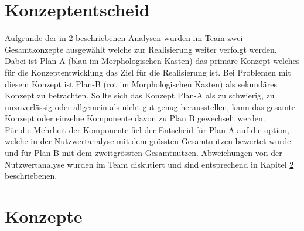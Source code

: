 \documentclass[11pt]{scrartcl}
\begin{document}
       


        \section{Konzeptentscheid}
        Aufgrunde der in \ref{konzepte} beschriebenen Analysen wurden im Team zwei Gesamtkonzepte ausgewählt welche zur Realisierung weiter verfolgt werden. Dabei ist Plan-A (blau im Morphologischen Kasten) das primäre Konzept welches für die Konzeptentwicklung das Ziel für die Realisierung ist. Bei Problemen mit diesem Konzept ist Plan-B (rot im Morphologischen Kasten) als sekundäres Konzept zu betrachten. Sollte sich das Konzept Plan-A als zu schwierig, zu unzuverlässig oder allgemein als nicht gut genug herausstellen, kann das gesamte Konzept oder einzelne Komponente davon zu Plan B gewechselt werden.\\
        Für die Mehrheit der Komponente fiel der Entscheid für Plan-A auf die option, welche in der Nutzwertanalyse mit dem grössten Gesamtnutzen bewertet wurde und für Plan-B mit dem zweitgrössten Gesamtnutzen. Abweichungen von der Nutzwertanalyse wurden im Team diskutiert und sind entsprechend in Kapitel \ref{konzepte} beschriebenen.  
       \pagebreak
        \section{Konzepte} \label{konzepte}
        
        \clearpage
        
        \clearpage
        
        \clearpage
        
        \clearpage
        
        \clearpage
        
        \clearpage
        
        \clearpage
        
        \clearpage
    
\end{document}
